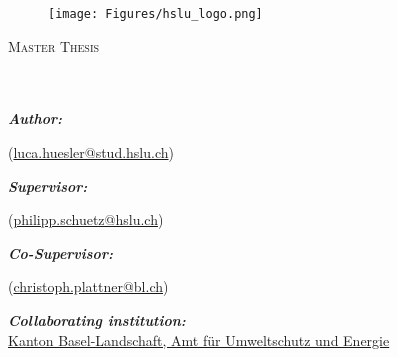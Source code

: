 
\begin{titlepage}
\begin{center}

\begin{figure}
\texttt{[image: Figures/hslu\_logo.png]} %
\end{figure}


\vspace*{.06\textheight}
{\scshape\LARGE \univname\par}\vspace{1cm} %
\textsc{\Large Master Thesis}\\[0.5cm] %

\HRule \\[0.4cm] %
{\huge \bfseries \ttitle\par}\vspace{0.4cm} %
\HRule \\[1.5cm] %
 

\emph{\textbf{Author:}}\\
\authorname %

(\href{mailto:luca.huesler@stud.hslu.ch}{luca.huesler@stud.hslu.ch})

\vspace{4mm}

\emph{\textbf{Supervisor:}} \\
\supname 

(\href{mailto:philipp.schuetz@hslu.ch}{philipp.schuetz@hslu.ch}) %
\vspace{4mm}

\emph{\textbf{Co-Supervisor:}} \\
\examname %

(\href{mailto:christoph.plattner@bl.ch}{christoph.plattner@bl.ch})

\vspace{4mm}
\emph{\textbf{Collaborating institution:}} \\
\href{https://www.baselland.ch/politik-und-behorden/direktionen/bau-und-umweltschutzdirektion/umweltschutz-energie}{Kanton Basel-Landschaft, Amt für Umweltschutz und Energie} 



\end{center}
\end{titlepage}
